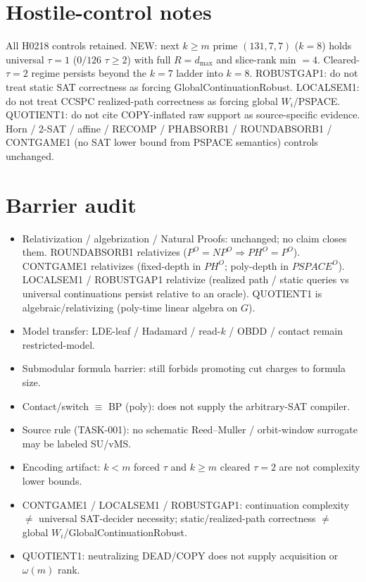 \documentclass[11pt]{article}
\begin{document}
\section*{Hostile-control notes}
All H0218 controls retained. NEW: next $k{\ge}m$ prime $(131,7,7)$ ($k{=}8$) holds universal
$\tau{=}1$ ($0/126$ $\tau{\ge}2$) with full $R{=}d_{\max}$ and slice-rank min $=4$.
Cleared-$\tau{=}2$ regime persists beyond the $k{=}7$ ladder into $k{=}8$.
ROBUSTGAP1: do not treat static SAT correctness as forcing GlobalContinuationRobust.
LOCALSEM1: do not treat CCSPC realized-path correctness as forcing global $W_i$/PSPACE.
QUOTIENT1: do not cite COPY-inflated raw support as source-specific evidence. Horn / 2-SAT / affine /
RECOMP / PHABSORB1 / ROUNDABSORB1 / CONTGAME1 (no SAT lower bound from PSPACE semantics)
controls unchanged.

\section*{Barrier audit}
\begin{itemize}
\item Relativization / algebrization / Natural Proofs: unchanged; no claim closes them.
  ROUNDABSORB1 relativizes ($P^O{=}NP^O\Rightarrow PH^O{=}P^O$).
  CONTGAME1 relativizes (fixed-depth in $PH^O$; poly-depth in $PSPACE^O$).
  LOCALSEM1 / ROBUSTGAP1 relativize (realized path / static queries vs universal continuations
  persist relative to an oracle).
  QUOTIENT1 is algebraic/relativizing (poly-time linear algebra on $G$).
\item Model transfer: LDE-leaf / Hadamard / read-$k$ / OBDD / contact remain restricted-model.
\item Submodular formula barrier: still forbids promoting cut charges to formula size.
\item Contact/switch $\equiv$ BP (poly): does not supply the arbitrary-SAT compiler.
\item Source rule (TASK-001): no schematic Reed--Muller / orbit-window surrogate may be labeled SU/vMS.
\item Encoding artifact: $k{<}m$ forced $\tau$ and $k{\ge}m$ cleared $\tau{=}2$ are not complexity lower bounds.
\item CONTGAME1 / LOCALSEM1 / ROBUSTGAP1: continuation complexity $\neq$ universal SAT-decider necessity;
  static/realized-path correctness $\neq$ global $W_i$/GlobalContinuationRobust.
\item QUOTIENT1: neutralizing DEAD/COPY does not supply acquisition or $\omega(m)$ rank.
\end{itemize}
\end{document}
